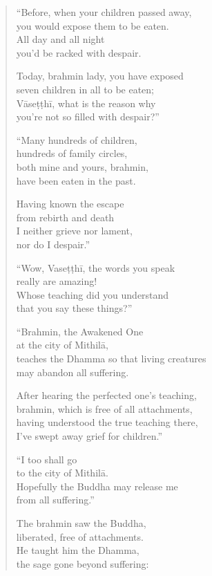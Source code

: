 \documentclass[12pt,openany]{book}%
\begin{document}
\begin{verse}%
“Before, when your children passed away, \\
you would expose them to be eaten. \\
All day and all night \\
you’d be racked with despair. 

Today, brahmin lady, you have exposed \\
seven children in all to be eaten; \\
\textsanskrit{Vāseṭṭhī}, what is the reason why \\
you’re not so filled with despair?” 

“Many hundreds of children, \\
hundreds of family circles, \\
both mine and yours, brahmin, \\
have been eaten in the past. 

Having known the escape \\
from rebirth and death \\
I neither grieve nor lament, \\
nor do I despair.” 

“Wow, \textsanskrit{Vaseṭṭhī}, the words you speak \\
really are amazing! \\
Whose teaching did you understand \\
that you say these things?” 

“Brahmin, the Awakened One \\
at the city of \textsanskrit{Mithilā}, \\
teaches the Dhamma so that living creatures \\
may abandon all suffering. 

After hearing the perfected one’s teaching, \\
brahmin, which is free of all attachments, \\
having understood the true teaching there, \\
I’ve swept away grief for children.” 

“I too shall go \\
to the city of \textsanskrit{Mithilā}. \\
Hopefully the Buddha may release me \\
from all suffering.” 

The brahmin saw the Buddha, \\
liberated, free of attachments. \\
He taught him the Dhamma, \\
the sage gone beyond suffering: 


\end{verse}
\end{document}
